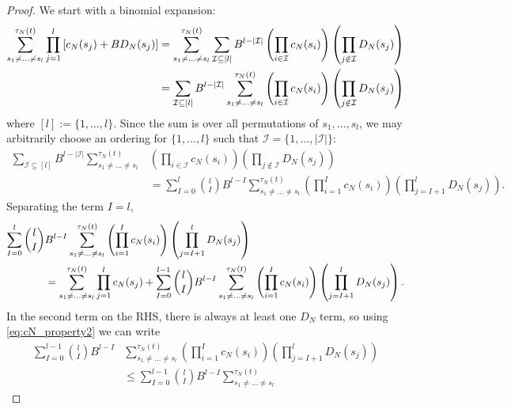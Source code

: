 \begin{proof}
We start with a binomial expansion:
\begin{align}
\sum_{s_1\neq\dots\neq s_l}^{\tau_N(t)} \prod_{j=1}^l 
        \left[ c_N(s_j) + B D_N(s_j) \right]
&= \sum_{s_1\neq\dots\neq s_l}^{\tau_N(t)} \sum_{\mathcal{I} \subseteq [l]}
        B^{l-|\mathcal{I}|} \left( \prod_{i\in\mathcal{I}} c_N(s_i) \right)
        \left( \prod_{j\notin\mathcal{I}} D_N(s_j) \right) \notag\\
&= \sum_{\mathcal{I} \subseteq [l]} B^{l-|\mathcal{I}|}
        \sum_{s_1\neq\dots\neq s_l}^{\tau_N(t)}
        \left( \prod_{i\in\mathcal{I}} c_N(s_i) \right)
        \left( \prod_{j\notin\mathcal{I}} D_N(s_j) \right) \label{eq:010}
\end{align}
where $[l] := \{1,\dots,l\}$. Since the sum is over all permutations of $s_1,\dots,s_l$, we may arbitrarily choose an ordering for $\{1,\dots,l\}$ such that $\mathcal{I} = \{ 1,\dots, |\mathcal{I}| \}$:
\begin{align*}
\sum_{\mathcal{I} \subseteq [l]} B^{l-|\mathcal{I}|}
        \sum_{s_1\neq\dots\neq s_l}^{\tau_N(t)}
        &\left( \prod_{i\in\mathcal{I}} c_N(s_i) \right)
        \left( \prod_{j\notin\mathcal{I}} D_N(s_j) \right) \\
&= \sum_{I=0}^l \binom{l}{I} B^{l-I} \sum_{s_1\neq\dots\neq s_l}^{\tau_N(t)}
        \left( \prod_{i=1}^I c_N(s_i) \right)
        \left( \prod_{j=I+1}^l D_N(s_j) \right) .
\end{align*}
Separating the term $I=l$,
\begin{align}
\sum_{I=0}^l \binom{l}{I} &B^{l-I} \sum_{s_1\neq\dots\neq s_l}^{\tau_N(t)}
        \left( \prod_{i=1}^I c_N(s_i) \right)
        \left( \prod_{j=I+1}^l D_N(s_j) \right) \notag\\
&= \sum_{s_1\neq\dots\neq s_l}^{\tau_N(t)} \prod_{j=1}^l c_N(s_j)
+ \sum_{I=0}^{l-1} \binom{l}{I} B^{l-I} 
        \sum_{s_1\neq\dots\neq s_l}^{\tau_N(t)}
        \left( \prod_{i=1}^I c_N(s_i) \right) \left( \prod_{j=I+1}^l D_N(s_j) \right). \label{eq:012}
\end{align}
In the second term on the RHS, there is always at least one $D_N$ term, so using \eqref{eq:cN_property2} we can write
\begin{align}
\sum_{I=0}^{l-1}\binom{l}{I} B^{l-I} &\sum_{s_1\neq\dots\neq s_l}^{\tau_N(t)}
        \left( \prod_{i=1}^I c_N(s_i) \right) \left( \prod_{j=I+1}^l D_N(s_j) \right) \\
&\leq \sum_{I=0}^{l-1}\binom{l}{I} B^{l-I} 
        \sum_{s_1\neq\dots\neq s_l}^{\tau_N(t)}

\end{align}
\end{proof}
